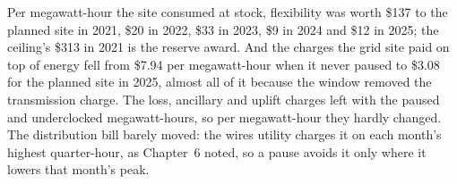 Per megawatt-hour the site consumed at stock, flexibility was worth \$137 to the planned site in 2021, \$20 in 2022, \$33 in 2023, \$9 in 2024 and \$12 in 2025; the ceiling's \$313 in 2021 is the reserve award. %
And the charges the grid site paid on top of energy fell from \$7.94 per megawatt-hour when it never paused to \$3.08 for the planned site in 2025, almost all of it because the window removed the transmission charge. The loss, ancillary and uplift charges left with the paused and underclocked megawatt-hours, so per megawatt-hour they hardly changed. The distribution bill barely moved: the wires utility charges it on each month's highest quarter-hour, as Chapter~6 noted, so a pause avoids it only where it lowers that month's peak. %

